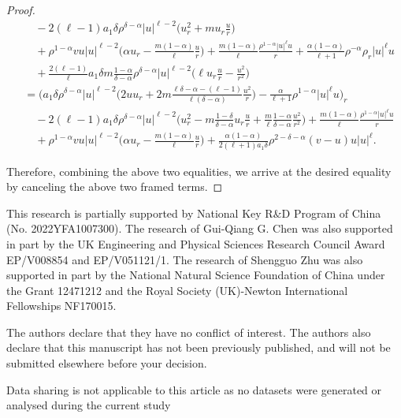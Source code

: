 \documentclass[11pt,reqno]{amsart}
\numberwithin{rk}{section}
\numberwithin{prop}{section}
\numberwithin{mydef}{section}
\numberwithin{lem}{section}
\numberwithin{equation}{section}
\numberwithin{thm}{section}
\begin{document}
\begin{proof}
\begin{align*}
&\quad -2(\ell-1)a_1\delta \rho^{\delta-\alpha}|u|^{\ell-2}\big( u_r^2+m u_r\frac{u}{r}\big) \\
&\quad+ \rho^{1-\alpha}v u|u|^{\ell-2}\Big(\alpha  u_r-\frac{m(1-\alpha)}{\ell}\frac{u}{r}\Big)+\frac{m(1-\alpha)}{\ell}\frac{\rho^{1-\alpha}|u|^\ell u}{r} +\frac{\alpha(1-\alpha)}{\ell+1} \rho^{-\alpha}\rho_r|u|^\ell u \\
&\quad +\frac{2(\ell-1)}{\ell} a_1\delta m\frac{1-\alpha}{\delta-\alpha} \rho^{\delta-\alpha} |u|^{\ell-2}\big(\ell u_r\frac{u}{r}- \frac{u^2}{r^2}\big)\\
&= \Big( a_1\delta \rho^{\delta-\alpha} |u|^{\ell-2}\big(2uu_r+ 2m \frac{\ell\delta-\alpha-(\ell-1)}{\ell(\delta-\alpha)} \frac{u^2}{r}\big)-\frac{\alpha}{\ell+1}  \rho^{1-\alpha}|u|^\ell u\Big)_r\\
&\quad -2(\ell-1)a_1\delta\rho^{\delta-\alpha}|u|^{\ell-2}\Big(u_r^2-m\frac{1-\delta}{\delta-\alpha}u_r\frac{u}{r}+\frac{m}{\ell}\frac{1-\alpha}{\delta-\alpha}\frac{u^2}{r^2}\Big) +\boxed{\frac{m(1-\alpha)}{\ell}\frac{\rho^{1-\alpha}|u|^\ell u}{r}}\\
&\quad+ \rho^{1-\alpha}v u|u|^{\ell-2}\Big(\alpha u_r-\frac{m(1-\alpha)}{\ell}\frac{u}{r}\Big)+\frac{\alpha(1-\alpha)}{2(\ell+1)a_1\delta}  \rho^{2-\delta-\alpha}(v-u)u|u|^\ell.
\end{align*}


Therefore, combining the above two equalities, we arrive at the desired equality by canceling the above two framed terms.
\end{proof}


\bigskip
{}  
This research is partially supported by National Key R$\&$D Program of China (No. 2022YFA1007300). The research of Gui-Qiang G. Chen was also supported in part by the UK Engineering and Physical Sciences Research
Council Award EP/V008854 and EP/V051121/1.
The research of Shengguo Zhu was also supported in part by 
the National Natural Science Foundation of China under the Grant  12471212 
and the Royal Society (UK)-Newton International 
Fellowships NF170015.

\bigskip
{} The authors declare  that they have no conflict of
interest. 
The authors also  declare that this manuscript has not been previously  published, 
and will not be submitted elsewhere before your decision.

\bigskip
{} Data sharing is not applicable to this article as no datasets were generated or analysed during the current study
\end{document}
